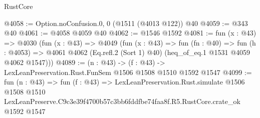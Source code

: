 \begin{lexlean}{RustCore}
\begin{coremodule}
@4058 := Option.noConfusion.{0, 0} (@1511 (@4013 @122)) @40
@4059 := @343 @40
@4061 := @4058 @4059 @40
@4062 := @1546 @1592
@4081 := fun (x : @43) =>
  @4030
    (fun (x : @43) =>
    @4049
      (fun (x : @43) =>
      fun (fn : @40) =>
      fun (h : @4053) =>
      @4061 @4062 (Eq.refl.{2} (Sort 1) @40) (heq_of_eq.{1} @1531 @4059 @4062 @1547)))
@4089 := (n : @43) -> (f : @43) -> LexLeanPreservation.Rust.FunSem @1506 @1508 @1510 @1592 @1547
@4099 := fun (n : @43) =>
  fun (f : @43) =>
  LexLeanPreservation.Rust.simulate
    @1506
    @1508
    @1510
    LexLeanPreserve.C9c3e39f4700b57c3bb6fddfbe74faa8f.R5.RustCore.crate_ok
    @1592
    @1547
\end{coremodule}
\end{lexlean}
